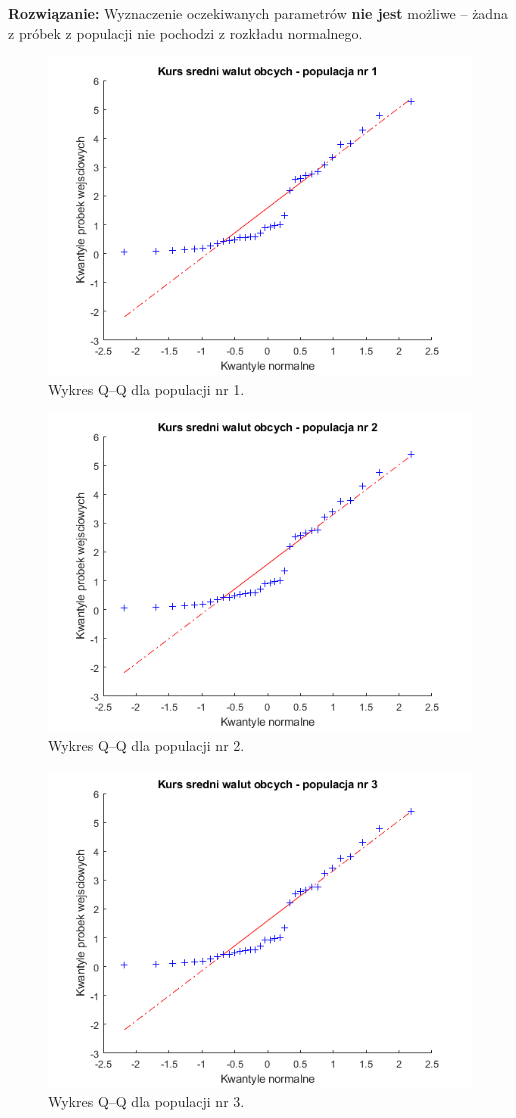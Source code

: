 \documentclass[12pt, a4paper]{article}
\begin{document}
\begin{hangparas}{2.85cm}{1}
\textbf{Rozwiązanie:} Wyznaczenie oczekiwanych parametrów \textbf{nie jest} możliwe -- żadna z próbek z populacji nie pochodzi z rozkładu normalnego.\newline
\end{hangparas}

\begin{figure}[H]
\centering
\includegraphics[width=.75\textwidth]{qqplot1.png}
\caption{Wykres Q--Q dla populacji nr 1.}
\label{fig:c61}
\end{figure}

\begin{figure}[H]
\centering
\includegraphics[width=.75\textwidth]{qqplot2.png}
\caption{Wykres Q--Q dla populacji nr 2.}
\label{fig:c62}
\end{figure}

\begin{figure}[H]
\centering
\includegraphics[width=.75\textwidth]{qqplot3.png}
\caption{Wykres Q--Q dla populacji nr 3.}
\label{fig:c63}
\end{figure}
\end{document}
